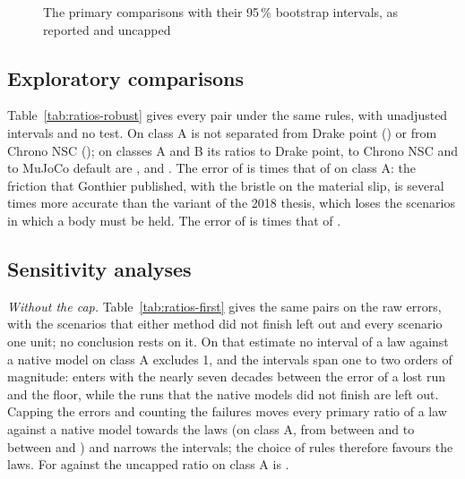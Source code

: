 \begin{figure}[!htbp]
\centering
{}
\caption{The primary comparisons with their 95\,\% bootstrap intervals, as reported and
uncapped}
\label{fig:forest}
\end{figure}

\subsection{Exploratory comparisons}

Table~\ref{tab:ratios-robust} gives every pair under the same rules, with unadjusted intervals
and no test. On class A  is not separated from Drake point
() or from Chrono NSC
(); on classes A and B its ratios to Drake point, to
Chrono NSC and to MuJoCo default are ,
 and
. The error of  is
 times that of  on class A: the friction
that Gonthier published, with the bristle on the material slip, is several times more accurate
than the variant of the 2018 thesis, which loses the scenarios in which a body must be held.
The error of  is  times that of
.

\begin{table}[!htbp]
\caption{Every pair under the rules of the primary comparisons: geometric mean of the ratio of
the capped errors, 95\,\% bootstrap interval (unadjusted), and units won, tied and lost by the
first method}
\label{tab:ratios-robust}
\end{table}

\subsection{Sensitivity analyses}

\emph{Without the cap.} Table~\ref{tab:ratios-first} gives the same pairs on the raw errors,
with the scenarios that either method did not finish left out and every scenario one unit; no
conclusion rests on it. On that estimate no interval of a law against a native model on class A
excludes 1, and the intervals span one to two orders of magnitude:  enters with
the nearly seven decades between the error of a lost run and the floor, while the runs that the
native models did not finish are left out. Capping the errors and counting the failures moves
every primary ratio of a law against a native model towards the laws (on class A, from between
 and  to between
 and ) and
narrows the intervals; the choice of rules therefore favours the laws. For  against
 the uncapped ratio on class A is .

